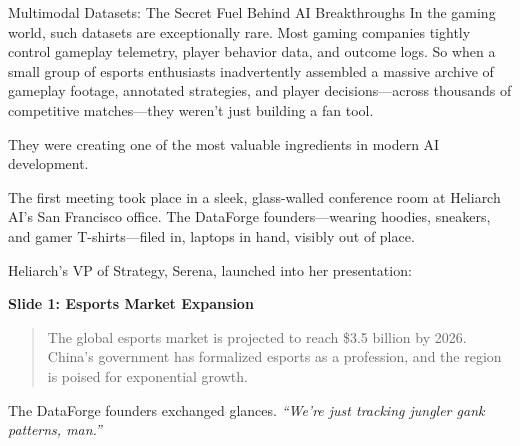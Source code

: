 \begin{HistoricalSidebar}{Multimodal Datasets: The Secret Fuel Behind AI Breakthroughs}
    In the gaming world, such datasets are exceptionally rare. Most gaming companies tightly control gameplay telemetry, player behavior data, and outcome logs. So when a small group of esports enthusiasts inadvertently assembled a massive archive of gameplay footage, annotated strategies, and player decisions—across thousands of competitive matches—they weren’t just building a fan tool.

    \medskip
    
    They were creating one of the most valuable ingredients in modern AI development.
    
\end{HistoricalSidebar}


The first meeting took place in a sleek, glass-walled conference room at Heliarch AI’s San Francisco office. The DataForge founders—wearing hoodies, sneakers, and gamer T-shirts—filed in, laptops in hand, visibly out of place.  

Heliarch’s VP of Strategy, Serena, launched into her presentation:

\textbf{Slide 1: Esports Market Expansion}

\begin{quote}
The global esports market is projected to reach \$3.5 billion by 2026. China’s government has formalized esports as a profession, and the region is poised for exponential growth.
\end{quote}
    
The DataForge founders exchanged glances. \textit{``We’re just tracking jungler gank patterns, man.''}

